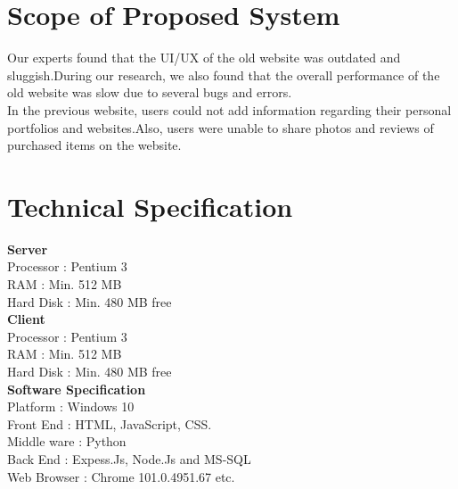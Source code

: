 \label{fig:Prototype Model}


\section{Scope of Proposed System}
Our experts found that the UI/UX of the old website was outdated and sluggish.During our research, we also found that the overall performance of the old website was slow due to several bugs and errors.\\
In the previous website, users could not add information regarding their personal portfolios and websites.Also, users were unable to share photos and reviews of purchased items on the website.






\section{Technical Specification}
\textbullet \hspace{0.2cm} \textbf{Server}\\
Processor		:	Pentium 3\\
RAM          	: 	Min. 512 MB\\
Hard Disk		: 	Min. 480 MB free\\
\textbullet \hspace{0.2cm} \textbf{Client}\\
Processor   		: 	Pentium 3\\
RAM           	: 	Min. 512 MB\\
Hard Disk		: 	Min. 480 MB free\\
\textbullet \hspace{0.2cm} \textbf{Software Specification}\\
Platform	:  	Windows 10\\
Front End		: 	HTML, JavaScript, CSS.\\
Middle ware		: 	Python\\
Back End			: 	Expess.Js, Node.Js and MS-SQL \\	
Web Browser		: 	Chrome  101.0.4951.67  etc. \\


